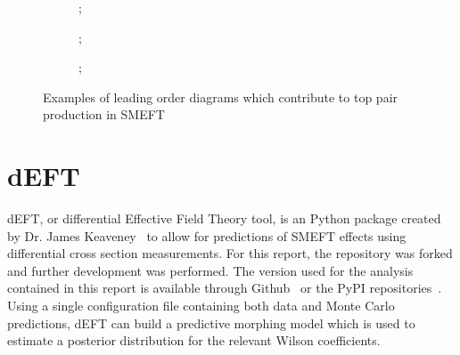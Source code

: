 \documentclass[a4paper,11pt]{article}
\begin{document}
\begin{figure}[htb]
    \centering
    \begin{subfigure}[b]{0.20\textwidth}
        ;
    \end{subfigure}
    \hfill
    \begin{subfigure}[b]{0.20\textwidth}
    ;
    \end{subfigure}
    \hfill
    \begin{subfigure}[b]{0.20\textwidth}
    ;
    \end{subfigure}
    \hfill
    \begin{subfigure}[b]{0.20\textwidth}
    \end{subfigure}

    \caption{Examples of leading order diagrams which contribute to top pair production in SMEFT}
\end{figure}

\section{dEFT}

dEFT, or differential Effective Field Theory tool, is an Python package created by Dr. James Keaveney~\cite{Keaveney_dEFT} to allow for predictions of SMEFT effects using differential cross section measurements.
For this report, the repository was forked and further development was performed.
The version used for the analysis contained in this report is available through Github~\cite{codecalec_dEFT} or the PyPI repositories~\cite{pypi_dEFT}.
Using a single configuration file containing both data and Monte Carlo predictions, dEFT can build a predictive morphing model which is used to estimate a posterior distribution for the relevant Wilson coefficients.
\end{document}
